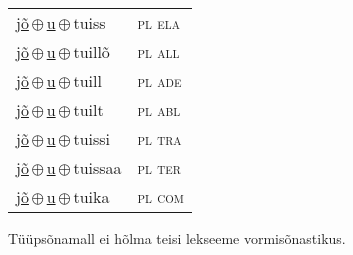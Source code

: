 \begin{minipage}{\textwidth}
\begin{sideways}
\begin{tabular}{l l}
\underline{jõ}\,$\oplus$\,\underline{u}\,$\oplus$\,tuiss & \textsc{ pl ela } \\
\underline{jõ}\,$\oplus$\,\underline{u}\,$\oplus$\,tuillõ & \textsc{ pl all } \\
\underline{jõ}\,$\oplus$\,\underline{u}\,$\oplus$\,tuill & \textsc{ pl ade } \\
\underline{jõ}\,$\oplus$\,\underline{u}\,$\oplus$\,tuilt & \textsc{ pl abl } \\
\underline{jõ}\,$\oplus$\,\underline{u}\,$\oplus$\,tuissi & \textsc{ pl tra } \\
\underline{jõ}\,$\oplus$\,\underline{u}\,$\oplus$\,tuissaa & \textsc{ pl ter } \\
\underline{jõ}\,$\oplus$\,\underline{u}\,$\oplus$\,tuika & \textsc{ pl com } \\
\end{tabular}
\end{sideways}
\label{tab:tüüpsõnamall-jõutu}

\end{minipage}

 
\vspace{1em}
\noindent Tüüpsõnamall  ei hõlma teisi lekseeme vormi\-sõnastikus.
